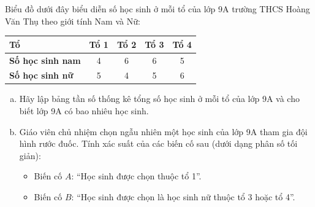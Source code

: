 \begin{bt}%
	Biểu đồ dưới đây biểu diễn số học sinh ở mỗi tổ của lớp 9A trường THCS Hoàng Văn Thụ theo giới tính Nam và Nữ:
	\begin{center}
		\begin{tabular}{|l|c|c|c|c|}
			\hline
			\textbf{Tổ} & Tổ 1 & Tổ 2 & Tổ 3 & Tổ 4 \\
			\hline
			\textbf{Số học sinh nam} & 4 & 6 & 6 & 5 \\
			\hline
			\textbf{Số học sinh nữ} & 5 & 4 & 5 & 6 \\
			\hline
		\end{tabular}
	\end{center}
	\begin{enumerate}[a)]
		\item Hãy lập bảng tần số thống kê tổng số học sinh ở mỗi tổ của lớp 9A và cho biết lớp 9A có bao nhiêu học sinh.
		\item Giáo viên chủ nhiệm chọn ngẫu nhiên một học sinh của lớp 9A tham gia đội hình rước đuốc. Tính xác suất của các biến cố sau (dưới dạng phân số tối giản):
		\begin{itemize}
			\item Biến cố $A$: ``Học sinh được chọn thuộc tổ 1''.
			\item Biến cố $B$: ``Học sinh được chọn là học sinh nữ thuộc tổ 3 hoặc tổ 4''.
		\end{itemize}
	\end{enumerate}
\end{bt}
